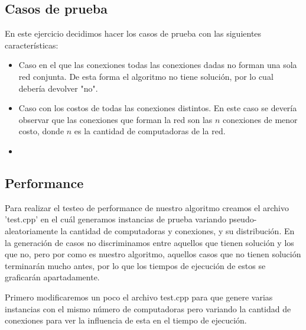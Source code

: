 \newpage


\subsection{Casos de prueba}

En este ejercicio decidimos hacer los casos de prueba con las siguientes caracter\'isticas:

\begin{itemize}
\item Caso en el que las conexiones todas las conexiones dadas no forman una sola red conjunta. De esta forma el algoritmo no tiene solución, por lo cual debería devolver "no".
\item Caso con los costos de todas las conexiones distintos. En este caso se devería observar que las conexiones que forman la red son las $n$ conexiones de menor costo, donde $n$ es la cantidad de computadoras de la red.
\item 
\end{itemize}


\newpage


\subsection{Performance}

Para realizar el testeo de performance de nuestro algoritmo creamos el archivo 'test.cpp' en el cu\'al generamos instancias de prueba variando pseudo-aleatoriamente la cantidad de computadoras y conexiones, y su distribuci\'on.
En la generación de casos no discriminamos entre aquellos que tienen soluci\'on y los que no, pero por como es nuestro algoritmo, aquellos casos que no tienen soluci\'on terminarán mucho antes, por lo que los tiempos de ejecuci\'on de estos se graficarán apartadamente.

Primero modificaremos un poco el archivo test.cpp para que genere varias instancias con el mismo n\'umero de computadoras pero variando la cantidad de conexiones para ver la influencia de esta en el tiempo de ejecuci\'on.





